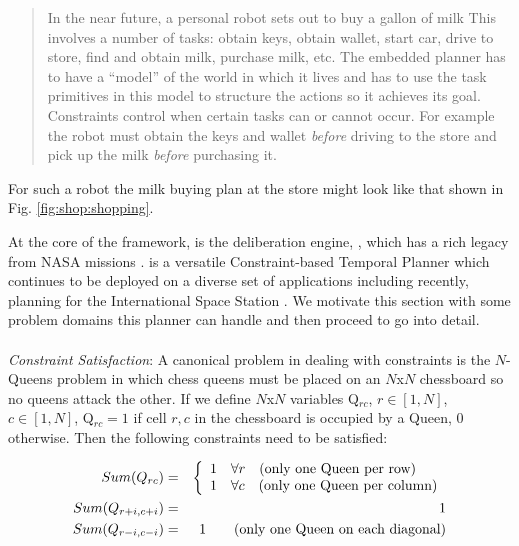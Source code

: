 {\small
  \begin{quote}
    In the near future, a personal robot sets out to buy a gallon of
    milk This involves a number of tasks: obtain keys, obtain wallet,
    start car, drive to store, find and obtain milk, purchase milk,
    etc.  The embedded planner has to have a ``model'' of the world in
    which it lives and has to use the task primitives in this model to
    structure the actions so it achieves its goal. Constraints control
    when certain tasks can or cannot occur. For example the robot must
    obtain the keys and wallet \emph{before} driving to the store and
    pick up the milk \emph{before} purchasing it.
\end{quote}

For such a robot the milk buying plan at the store might look like
that shown in Fig. \ref{fig:shop:shopping}.

At the core of the \rx framework, is the deliberation engine, \eue,
which has a rich legacy from NASA missions \cite{mus98,rajan00,
  jonsson00,aichang04, bresina05}. \eu is a versatile Constraint-based
Temporal Planner which continues to be deployed on a diverse set of
applications including recently, planning for the International Space
Station \cite{barreiro09}. We motivate this section with some problem
domains this planner can handle and then proceed to go into detail.

\paragraph{} {\em Constraint Satisfaction}: A canonical problem in
dealing with constraints is the $N$-Queens problem in which chess queens
must be placed on an  $N$x$N$ chessboard so no queens attack the other. %
If we define $N$x$N$ variables Q$_{rc}$, $r \in [1,N]$, $c \in [1,N]$,
Q$_{rc} = 1$ if cell $r,c$ in the chessboard is occupied by a Queen,
$0$ otherwise. Then the following constraints need to be satisfied:

\begin{eqnarray*}
 Sum(Q_{rc}) & = & \left\{
   \begin{array}{l l}
     1 & \forall r \quad \mbox{(only one Queen per row)}\\
     1 & \forall c \quad \mbox{(only one Queen per column)}\\ 
   \end{array} \right. \\
Sum(Q_{r+i,c+i}) & = & 1\\
Sum(Q_{r-i,c-i}) & = & 1 \qquad \mbox{(only one Queen on each diagonal)}\\
\end{eqnarray*} 

}
